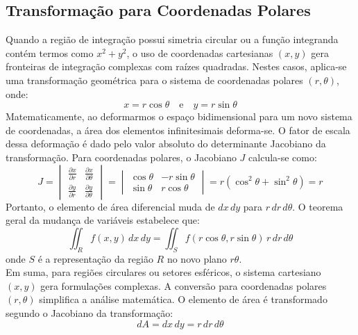 \documentclass[12pt,a4paper]{article}
\begin{document}
\subsection{Transformação para Coordenadas Polares}
Quando a região de integração possui simetria circular ou a função integranda contém termos como $x^2 + y^2$, o uso de coordenadas cartesianas $(x,y)$ gera fronteiras 
de integração complexas com raízes quadradas. Nestes casos, aplica-se uma transformação geométrica para o sistema de coordenadas polares $(r, \theta)$, onde:
\begin{equation}
    x = r \cos\theta \quad \text{e} \quad y = r \sin\theta
\end{equation}
Matematicamente, ao deformarmos o espaço bidimensional para um novo sistema de coordenadas, a área dos elementos infinitesimais deforma-se. O fator de escala dessa 
deformação é dado pelo valor absoluto do determinante Jacobiano da transformação. Para coordenadas polares, o Jacobiano $J$ calcula-se como:
\begin{equation}
    J = \begin{vmatrix} 
    \frac{\partial x}{\partial r} & \frac{\partial x}{\partial \theta} \\ 
    \frac{\partial y}{\partial r} & \frac{\partial y}{\partial \theta} 
    \end{vmatrix}
    = \begin{vmatrix} 
    \cos\theta & -r\sin\theta \\ 
    \sin\theta & r\cos\theta 
    \end{vmatrix}
    = r(\cos^2\theta + \sin^2\theta) = r
\end{equation}
Portanto, o elemento de área diferencial muda de $dx\,dy$ para $r \,dr \,d\theta$. O teorema geral da mudança de variáveis estabelece que:
\begin{equation}
    \iint_R f(x,y) \,dx\,dy = \iint_{S} f(r\cos\theta, r\sin\theta) \, r \,dr\,d\theta
\end{equation}
onde $S$ é a representação da região $R$ no novo plano $r\theta$.
\\ Em suma, para regiões circulares ou setores esféricos, o sistema cartesiano $(x, y)$ gera formulações complexas. A conversão para coordenadas polares $(r, \theta)$ simplifica a análise matemática. O elemento de área é transformado segundo o Jacobiano da transformação:
\begin{equation}
    dA = dx \, dy = r \, dr \, d\theta
\end{equation}
\end{document}
